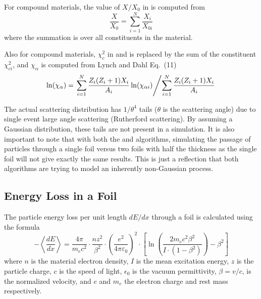 For compound materials, the value of $X/X_0$ in  is computed from
\begin{equation}
  \frac{X}{X_0} = \sum_{i = 1}^N \frac{X_i}{X_{0i}}
\end{equation}
where the summation is over all constituents in the material.

Also for compound materials, $\chi_c^2$ in  and  is replaced by the sum of the
constituent $\chi_{ci}^2$, and $\chi_\alpha$ is computed from Lynch and Dahl Eq.~(11)
\begin{equation}
  \ln ( \chi_\alpha ) = \left. \sum_{i=1}^N \frac{Z_i (Z_i + 1) X_i}{A_i} \ln(\chi_{\alpha i}) \middle/
  \sum_{i=1}^N \frac{Z_i (Z_i + 1) X_i}{A_i} \right.
\end{equation}

The actual scattering distribution has $1/\theta^4$ tails ($\theta$ is the scattering angle) due to
single event large angle scattering (Rutherford scattering). By assuming a Gaussian distribution,
these tails are not present in a simulation. It is also important to note that with both the
 and  algorithms, simulating the passage of particles through a single
foil versus two foils with half the thickness as the single foil will not give exactly the same
results. This is just a reflection that both algorithms are trying to model an inherently non-Gaussian
process.

\subsection{Energy Loss in a Foil}
\label{s:foil.eloss}

The particle energy loss per unit length $dE/dx$ through a foil is calculated using the  formula
\begin{equation}
  - \left\langle\frac{dE}{dx}\right\rangle = 
  \frac{4 \pi}{m_e c^2} \cdot \frac{nz^2}{\beta^2} \cdot \left(\frac{e^2}{4\pi\varepsilon_0}\right)^2 \cdot 
  \left[\ln \left(\frac{2m_e c^2 \beta^2}{I \cdot (1-\beta^2)}\right) - \beta^2\right]
  \label{ex4pmc}
\end{equation}
where $n$ is the material electron density, $I$ is the mean excitation energy, $z$ is the particle
charge, $c$ is the speed of light, $\epsilon_0$ is the vacuum permittivity, $\beta = {v}/{c}$, is
the normalized velocity, and $e$ and $m_e$ the electron charge and rest mass respectively.

